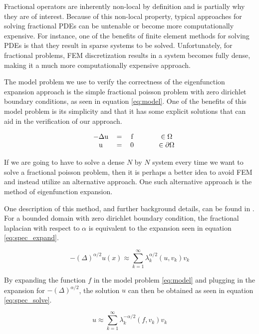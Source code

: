Fractional operators are inherently non-local by definition and is partially why they are of interest. Because of this non-local property, typical approaches for solving fractional PDEs can be untenable or become more computationally expensive. For instance, one of the benefits of finite element methods for solving PDEs is that they result in sparse systems to be solved. Unfortunately, for fractional problems, FEM discretization results in a system becomes fully dense, making it a much more computationally expensive approach.

The model problem we use to verify the correctness of the eigenfunction expansion approach is the simple fractional poisson problem with zero dirichlet boundary conditions, as seen in equation \eqref{eq:model}. One of the benefits of this model problem is its simplicity and that it has some explicit solutions that can aid in the verification of our approach.

\begin{equation}
\label{eq:model}
\begin{tabular}{ccccccc}
& $-\Delta$u & = & f &  & & $\in \Omega$ \\
& u & = & 0 &  &  & $ \in \partial \Omega$
\end{tabular} 
\end{equation}

If we are going to have to solve a dense $N$ by $N$ system every time we want to solve a fractional poisson problem, then it is perhaps a better idea to avoid FEM and instead utilize an alternative approach. One such alternative approach is the method of eigenfunction expansion. 

One description of this method, and further background details, can be found in \cite{flaplacian}. For a bounded domain with zero dirichlet boundary condition, the fractional laplacian with respect to $ \alpha $ is equivalent to the expansion seen in equation \eqref{eq:spec_expand}.

\begin{equation}
\label{eq:spec_expand}
-(\Delta)^{\alpha/2} u(x) \approx \sum_{k=1}^{\infty} \lambda_k^{\alpha/2} (u, v_k) v_k
\end{equation}

By expanding the function $f$ in the model problem \eqref{eq:model} and plugging in the expansion for $ -(\Delta)^{\alpha/2} $, the solution $u$ can then be obtained as seen in equation \eqref{eq:spec_solve}.

\begin{equation}
\label{eq:spec_solve}
u \approx \sum_{k=1}^{\infty} \lambda_k^{-\alpha/2} (f, v_k) v_k
\end{equation}

